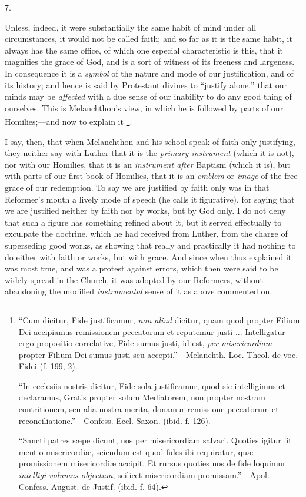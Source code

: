 7.

Unless, indeed, it were substantially the same habit of mind under
all circumstances, it would not be called faith; and so far as it is
the same habit, it always has the same office, of which one especial
characteristic is this, that it magnifies the grace of God, and is a
sort of witness of its freeness and largeness. In consequence it
is a \emph{symbol} of the nature and mode of our justification, and of
its history; and hence is said by Protestant divines to ``justify
alone,'' that our minds may be \emph{affected} with a due sense of
our inability to do any good thing of ourselves. This is Melanchthon's
view, in which he is followed by parts of our Homilies;—and now to
explain it \footnote{``Cum
dicitur, Fide justificamur, \emph{non aliud} dicitur, quam quod
propter Filium Dei accipiamus remissionem peccatorum et reputemur
justi ... Intelligatur ergo propositio correlative, Fide sumus justi,
id est, \emph{per misericordiam} propter Filium Dei sumus justi seu
accepti.''—Melanchth. Loc. Theol. de voc. Fidei (f. 199, 2).

``In ecclesiis nostris dicitur, Fide sola justificamur, quod
sic intelligimus et declaramus, Gratis propter solum Mediatorem, non
propter nostram contritionem, seu alia nostra merita, donamur
remissione peccatorum et reconciliatione.''—Confess. Eccl.
Saxon. (ibid. f. 126).

``Sancti patres sæpe dicunt, nos per misericordiam salvari.
Quoties igitur fit mentio misericordiæ, sciendum est quod fides ibi
requiratur, quæ promissionem misericordiæ accipit. Et rursus quoties
nos de fide loquimur \emph{intelligi volumus objectum}, scilicet
misericordiam promissam.''—Apol. Confess. August. de Justif. (ibid. f.
64).}.

I say, then, that when Melanchthon and his school speak of faith
only justifying, they neither say with Luther that it is the \emph{primary
instrument} (which it is not), nor with our Homilies, that it is an
\emph{instrument after} Baptism (which it is), but with parts of our
first book of Homilies, that it is an \emph{emblem} or \emph{image} of
the free grace of our redemption. To say we are justified by faith
only was in that Reformer's mouth a lively mode of speech (he calls it
figurative), for saying that we are justified neither by faith nor by
works, but by God only. I do not deny that such a figure has something
refined about it, but it served effectually to exculpate the
doctrine, which he had received from Luther, from the charge of
superseding good works, as showing that really and practically it had
nothing to do either with faith or works, but with grace. And since
when thus explained it was most true, and was a protest against
errors, which then were said to be widely spread in the Church, it was
adopted by our Reformers, without abandoning the modified \emph{instrumental}
sense of it as above commented on.

